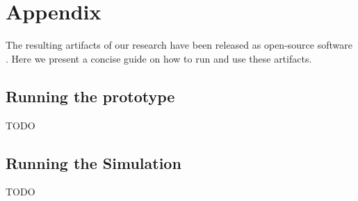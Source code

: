 \chapter{Appendix}

The resulting artifacts of our research have been released as open-source software \cite{thesis-github}. Here we present a concise guide on how to run and use these artifacts.

\section{Running the prototype}
TODO

\section{Running the Simulation}
TODO


\iffalse
If you need to include an appendix to support the research in your thesis, you can place it at the end of the manuscript.
An appendix contains supplementary material (figures, tables, data, codes, mathematical proofs, surveys, \dots)
which supplement the main results contained in the previous chapters.
\fi
